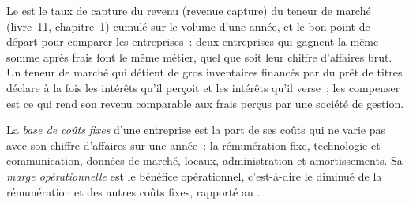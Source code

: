 Le  est le taux de capture du revenu (revenue capture) du teneur de marché (livre~11, chapitre~1)
cumulé sur le volume d'une année, et le bon point de départ pour comparer les entreprises~: deux entreprises qui gagnent la même somme après frais font le même métier, quel que
soit leur chiffre d'affaires brut. Un teneur de marché qui détient de gros inventaires financés par du prêt de titres déclare à la fois les intérêts qu'il perçoit et les
intérêts qu'il verse~; les compenser est ce qui rend son revenu comparable aux frais perçus par une société de gestion.

\begin{definition}\label{def:fm:the-economics-of-a-trading-firm:fixed}
La \emph{base de coûts fixes} d'une entreprise est la part de ses coûts qui ne varie pas avec son chiffre d'affaires sur une année~: la rémunération fixe,
technologie et communication, données de marché, locaux, administration et amortissements. Sa \emph{marge opérationnelle} est
le bénéfice opérationnel, c'est-à-dire le  diminué de la rémunération et des autres coûts fixes, rapporté au .
\end{definition}

